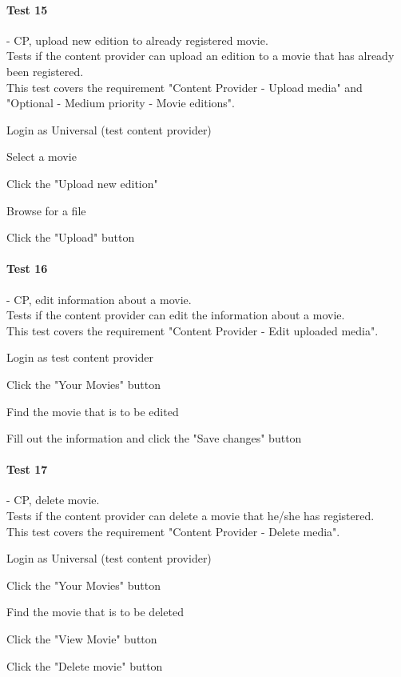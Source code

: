 \paragraph{Test 15} - CP, upload new edition to already registered movie. \\
Tests if the content provider can upload an edition to a movie that has already been registered. \\
This test covers the requirement "Content Provider - Upload media" and "Optional - Medium priority - Movie editions".
\begin{my_enumerate}
\item Login as Universal (test content provider)
\item Select a movie
\item Click the "Upload new edition"
\item Browse for a file
\item Click the "Upload" button
\end{my_enumerate}

\paragraph{Test 16} - CP, edit information about a movie. \\
Tests if the content provider can edit the information about a movie. \\
This test covers the requirement "Content Provider - Edit uploaded media".
\begin{my_enumerate}
\item Login as test content provider
\item Click the "Your Movies" button
\item Find the movie that is to be edited
\item Fill out the information and click the "Save changes" button
\end{my_enumerate}

\paragraph{Test 17} - CP, delete movie. \\
Tests if the content provider can delete a movie that he/she has registered. \\
This test covers the requirement "Content Provider - Delete media".
\begin{my_enumerate}
\item Login as Universal (test content provider)
\item Click the "Your Movies" button
\item Find the movie that is to be deleted
\item Click the "View Movie" button
\item Click the "Delete movie" button
\end{my_enumerate}

